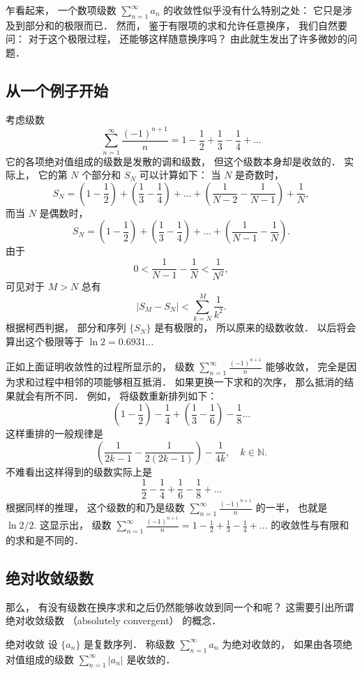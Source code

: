 

乍看起来， 一个数项级数 $\sum_{n=1}^\infty a_n$ 的收敛性似乎没有什么特别之处： 它只是涉及到部分和的极限而已． 然而， 鉴于有限项的求和允许任意换序， 我们自然要问： 对于这个极限过程， 还能够这样随意换序吗？ 由此就生发出了许多微妙的问题．

\subsection{从一个例子开始}

考虑级数
$$
\sum_{n=1}^\infty\frac{(-1)^{n+1}}{n}
=1-\frac{1}{2}+\frac{1}{3}-\frac{1}{4}+...
$$
它的各项绝对值组成的级数是发散的调和级数， 但这个级数本身却是收敛的． 实际上， 它的第 $N$ 个部分和 $S_N$ 可以计算如下： 当 $N$ 是奇数时，
$$
S_N=\left(1-\frac{1}{2}\right)+\left(\frac{1}{3}-\frac{1}{4}\right)+...+\left(\frac{1}{N-2}-\frac{1}{N-1}\right)+\frac{1}{N},
$$
而当 $N$ 是偶数时，
$$
S_N=\left(1-\frac{1}{2}\right)+\left(\frac{1}{3}-\frac{1}{4}\right)+...+\left(\frac{1}{N-1}-\frac{1}{N}\right).
$$
由于
$$
0<\frac{1}{N-1}-\frac{1}{N}<\frac{1}{N^2},
$$
可见对于 $M>N$ 总有
$$
|S_M-S_N|<\sum_{k=N}^M\frac{1}{k^2}.
$$
根据柯西判据， 部分和序列 $\{S_N\}$ 是有极限的， 所以原来的级数收敛． 以后将会算出这个极限等于 $\ln2=0.6931...$

正如上面证明收敛性的过程所显示的， 级数 $\sum_{n=1}^\infty\frac{(-1)^{n+1}}{n}$ 能够收敛， 完全是因为求和过程中相邻的项能够相互抵消． 如果更换一下求和的次序， 那么抵消的结果就会有所不同． 例如， 将级数重新排列如下：
$$
\left(1-\frac{1}{2}\right)-\frac{1}{4}+\left(\frac{1}{3}-\frac{1}{6}\right)-\frac{1}{8}...
$$
这样重排的一般规律是
$$
\left(\frac{1}{2k-1}-\frac{1}{2(2k-1)}\right)-\frac{1}{4k},
\quad k\in\mathbb{N}.
$$
不难看出这样得到的级数实际上是
$$
\frac{1}{2}-\frac{1}{4}+\frac{1}{6}-\frac{1}{8}+...
$$
根据同样的推理， 这个级数的和乃是级数 $\sum_{n=1}^\infty\frac{(-1)^{n+1}}{n}$ 的一半， 也就是 $\ln2/2$. 这显示出， 级数 $\sum_{n=1}^\infty\frac{(-1)^{n+1}}{n}
=1-\frac{1}{2}+\frac{1}{3}-\frac{1}{4}+...$ 的收敛性与有限和的求和是不同的．

\subsection{绝对收敛级数}

那么， 有没有级数在换序求和之后仍然能够收敛到同一个和呢？ 这需要引出所谓绝对收敛级数 （absolutely convergent） 的概念．

\begin{definition}{绝对收敛}
设 $\{a_n\}$ 是复数序列． 称级数 $\sum_{n=1}^\infty a_n$ 为绝对收敛的， 如果由各项绝对值组成的级数 $\sum_{n=1}^\infty|a_n|$ 是收敛的．
\end{definition}

